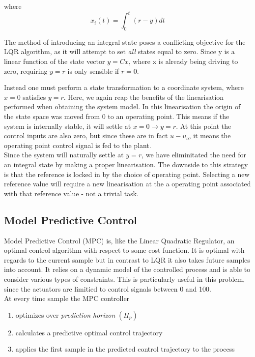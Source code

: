 where
\begin{equation}
	x_i(t) = \int_{0}^{t}(r-y)dt
\end{equation}

The method of introducing an integral state poses a conflicting objective for the LQR algorithm, as it will attempt to set \textit{all} states equal to zero. Since y is a linear function of the state vector $y = Cx$, where x is already being driving to zero, requiring $y=r$ is only sensible if $r=0$.

Instead one must perform a state transformation to a coordinate system, where $x=0$ satisfies $y=r$. Here, we again reap the benefits of the linearisation performed when obtaining the system model. In this linearisation the origin of the state space was moved from 0 to an operating point. This means if the system is internally stable, it will settle at $x=0 \rightarrow y=r$. At this point the control inputs are also zero, but since these are in fact $u-u_o$, it means the operating point control signal is fed to the plant. \\
Since the system will naturally settle at $y=r$, we have eliminitated the need for an integral state by making a proper linearisation. The downside to this strategy is that the reference is locked in by the choice of operating point. Selecting a new reference value will require a new linearisation at the a operating point associated with that reference value - not a trivial task. 

\subsection{Model Predictive Control}
Model Predictive Control (MPC) is, like the Linear Quadratic Regulator, an optimal control algorithm with respect to some cost function. It is optimal with regards to the current sample but in contrast to LQR it also takes future samples into account. It relies on a dynamic model of the controlled process and is able to consider various types of constraints. This is particularly useful in this problem, since the actuators are limitied to control signals between 0 and 100.\\

At every time sample the MPC controller
\begin{enumerate}
	\item optimizes over \textit{prediction horizon} $(H_p)$
	\item calculates a predictive optimal control trajectory
	\item applies the first sample in the predicted control trajectory to the process
\end{enumerate}

